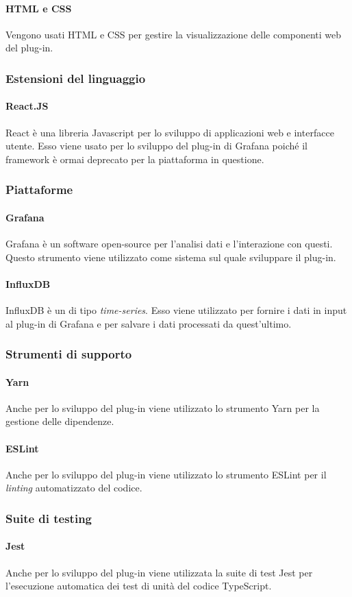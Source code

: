 \documentclass[../manuale-sviluppatore.tex]{subfiles}
\begin{document}
\paragraph{HTML e CSS}
Vengono usati HTML e CSS per gestire la visualizzazione delle componenti web del plug-in.

\subsubsection{Estensioni del linguaggio}
\paragraph{React.JS}
React è una libreria Javascript per lo sviluppo di applicazioni web e interfacce utente. Esso viene usato per lo sviluppo del plug-in di Grafana poiché il framework  è ormai deprecato per la piattaforma in questione.

\subsubsection{Piattaforme}
\paragraph{Grafana}
Grafana è un software open-source per l'analisi dati e l'interazione con questi. Questo strumento viene utilizzato come sistema sul quale sviluppare il plug-in.

\paragraph{InfluxDB}
InfluxDB è un  di tipo \textit{time-series}. Esso viene utilizzato per fornire i dati in input al plug-in di Grafana e per salvare i dati processati da quest'ultimo.

\subsubsection{Strumenti di supporto}
\paragraph{Yarn}
Anche per lo sviluppo del plug-in viene utilizzato lo strumento Yarn per la gestione delle dipendenze.

\paragraph{ESLint}
Anche per lo sviluppo del plug-in viene utilizzato lo strumento ESLint per il \textit{linting} automatizzato del codice.

\subsubsection{Suite di testing}
\paragraph{Jest}
Anche per lo sviluppo del plug-in viene utilizzata la suite di test Jest per l'esecuzione automatica dei test di unità del codice TypeScript.
\end{document}
